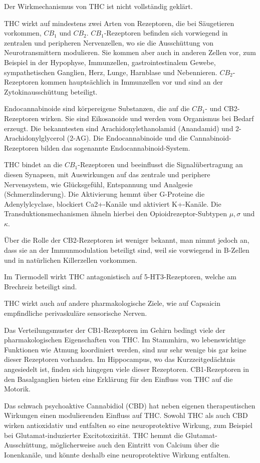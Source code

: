 \documentclass[openany]{scrbook}
\begin{document}
		Der Wirkmechanismus von THC ist nicht vollständig geklärt.
		
		THC wirkt auf mindestens zwei Arten von Rezeptoren, die bei Säugetieren vorkommen, $CB_1$ und $CB_2$. $CB_1$-Rezeptoren befinden sich vorwiegend in zentralen und peripheren Nervenzellen, wo sie die Ausschüttung von Neurotransmittern modulieren. Sie kommen aber auch in anderen Zellen vor, zum Beispiel in der Hypophyse, Immunzellen, gastrointestinalem Gewebe, sympathetischen Ganglien, Herz, Lunge, Harnblase und Nebennieren. $CB_2$-Rezeptoren kommen hauptsächlich in Immunzellen vor und sind an der Zytokinausschüttung beteiligt.
		
		Endocannabinoide sind körpereigene Substanzen, die auf die $CB_1$- und CB2-Rezeptoren wirken. Sie sind Eikosanoide und werden vom Organismus bei Bedarf erzeugt. Die bekanntesten sind Arachidonylethanolamid (Anandamid) und 2-Arachidonylglycerol (2-AG). Die Endocannabinoide und die Cannabinoid-Rezeptoren bilden das sogenannte Endocannabinoid-System.
		
		THC bindet an die $CB_1$-Rezeptoren und beeinflusst die Signalübertragung an diesen Synapsen, mit Auswirkungen auf das zentrale und periphere Nervensystem, wie Glücksgefühl, Entspannung und Analgesie (Schmerzlinderung). Die Aktivierung hemmt über G-Proteine die Adenylylcyclase, blockiert Ca2+-Kanäle und aktiviert K+-Kanäle. Die Transduktionsmechanismen ähneln hierbei den Opioidrezeptor-Subtypen $\mu,\sigma$ und $\kappa.$
		
		Über die Rolle der CB2-Rezeptoren ist weniger bekannt, man nimmt jedoch an, dass sie an der Immunmodulation beteiligt sind, weil sie vorwiegend in B-Zellen und in natürlichen Killerzellen vorkommen.
		
		Im Tiermodell wirkt THC antagonistisch auf 5-HT3-Rezeptoren, welche am Brechreiz beteiligt sind.
		
		THC wirkt auch auf andere pharmakologische Ziele, wie auf Capsaicin empfindliche perivaskuläre sensorische Nerven.
		
		Das Verteilungsmuster der CB1-Rezeptoren im Gehirn bedingt viele der pharmakologischen Eigenschaften von THC. Im Stammhirn, wo lebenswichtige Funktionen wie Atmung koordiniert werden, sind nur sehr wenige bis gar keine dieser Rezeptoren vorhanden. Im Hippocampus, wo das Kurzzeitgedächtnis angesiedelt ist, finden sich hingegen viele dieser Rezeptoren. CB1-Rezeptoren in den Basalganglien bieten eine Erklärung für den Einfluss von THC auf die Motorik.
		
		Das schwach psychoaktive Cannabidiol (CBD) hat neben eigenen therapeutischen Wirkungen einen modulierenden Einfluss auf THC. Sowohl THC als auch CBD wirken antioxidativ und entfalten so eine neuroprotektive Wirkung, zum Beispiel bei Glutamat-induzierter Excitotoxizität. THC hemmt die Glutamat-Ausschüttung, möglicherweise auch den Eintritt von Calcium über die Ionenkanäle, und könnte deshalb eine neuroprotektive Wirkung entfalten.
		
\end{document}
